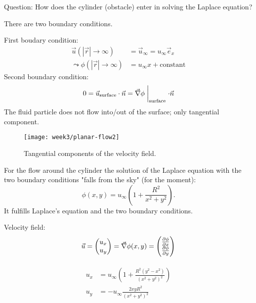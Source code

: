 Question: How does the cylinder (obstacle) enter in solving the Laplace equation?

There are two boundary conditions.

First boudary condition:
\begin{align}
\vec{u}(|\vec{r}|\rightarrow\infty) &= \vec{u}_\infty = u_\infty\vec{e}_x \\
\leadsto
\phi(|\vec{r}|\rightarrow\infty) &= u_\infty x + \mathrm{constant}
\end{align}
Second boundary condition:
\begin{equation}
0=\vec{u}_\mathrm{surface}\cdot \vec{n} = \vec{\nabla}\phi\biggm\vert_\mathrm{surface}\cdot\vec{n}
\end{equation}
The fluid particle does not flow into/out of the surface; only tangential component.

\begin{figure}[!h]
    \centering
    \texttt{[image: week3/planar-flow2]}
    \caption{Tangential components of the velocity field.}
    \label{fig:planar-flow2}
\end{figure}

For the flow around the cylinder the solution of the Laplace equation with the two boundary conditions "falls from the sky" (for the moment):
\begin{equation}\label{eq:cylinder-flow}
\phi(x,y)=u_\infty\left(1+\frac{R^2}{x^2+y^2}\right).
\end{equation}
It fulfills Laplace's equation and the two boundary conditions.

Velocity field:
\begin{equation}
\vec{u} = \begin{pmatrix}
u_x\\u_y
\end{pmatrix}  = 
\vec{\nabla}\phi(x,y) = \begin{pmatrix}
\frac{\partial \phi}{\partial x} \\
\frac{\partial \phi}{\partial y}
\end{pmatrix}
\end{equation}

\begin{align}
\begin{split}\label{eq:uxuy1}
u_x &= u_\infty\left(1+\frac{R^2(y^2-x^2)}{(x^2+y^2)^2}\right)\\
u_y &= -u_\infty \frac{2xyR^2}{(x^2+y^2)^2}
\end{split}
\end{align}

